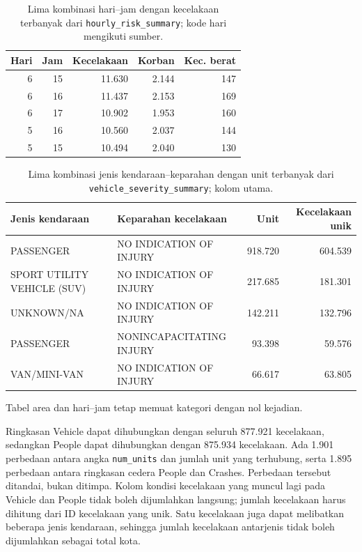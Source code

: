 \documentclass[10pt,a4paper]{article}
\begin{document}
\begin{table}[H]
\centering\scriptsize
\caption{Lima kombinasi hari--jam dengan kecelakaan terbanyak dari \texttt{hourly\_risk\_summary}; kode hari mengikuti sumber.}
\begin{tabular}{rrrrr}
\toprule
Hari & Jam & Kecelakaan & Korban & Kec. berat\\
\midrule
6 & 15 & 11.630 & 2.144 & 147\\
6 & 16 & 11.437 & 2.153 & 169\\
6 & 17 & 10.902 & 1.953 & 160\\
5 & 16 & 10.560 & 2.037 & 144\\
5 & 15 & 10.494 & 2.040 & 130\\
\bottomrule
\end{tabular}
\end{table}

\begin{table}[H]
\centering\scriptsize
\caption{Lima kombinasi jenis kendaraan--keparahan dengan unit terbanyak dari \texttt{vehicle\_severity\_summary}; kolom utama.}
\begin{tabularx}{\linewidth}{>{\raggedright\arraybackslash}X
>{\raggedright\arraybackslash}Xrr}
\toprule
Jenis kendaraan & Keparahan kecelakaan & Unit & Kecelakaan unik\\
\midrule
PASSENGER & NO INDICATION OF INJURY & 918.720 & 604.539\\
SPORT UTILITY VEHICLE (SUV) & NO INDICATION OF INJURY & 217.685 & 181.301\\
UNKNOWN/NA & NO INDICATION OF INJURY & 142.211 & 132.796\\
PASSENGER & NONINCAPACITATING INJURY & 93.398 & 59.576\\
VAN/MINI-VAN & NO INDICATION OF INJURY & 66.617 & 63.805\\
\bottomrule
\end{tabularx}
\end{table}

Tabel area dan hari--jam tetap memuat kategori dengan nol kejadian.

Ringkasan Vehicle dapat dihubungkan dengan seluruh 877.921 kecelakaan,
sedangkan People dapat dihubungkan dengan 875.934 kecelakaan. Ada 1.901
perbedaan antara angka \texttt{num\_units} dan jumlah unit yang terhubung,
serta 1.895 perbedaan antara ringkasan cedera People dan Crashes.
Perbedaan tersebut ditandai, bukan ditimpa. Kolom kondisi kecelakaan yang
muncul lagi pada Vehicle dan People tidak boleh dijumlahkan langsung;
jumlah kecelakaan harus dihitung dari ID kecelakaan yang unik. Satu
kecelakaan juga dapat melibatkan beberapa jenis kendaraan, sehingga jumlah
kecelakaan antarjenis tidak boleh dijumlahkan sebagai total kota.
\end{document}
